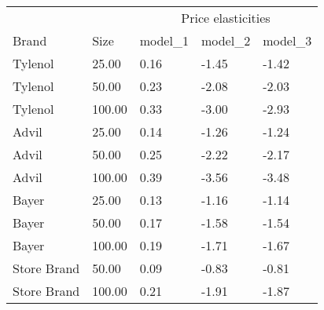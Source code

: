 \begin{table}
\centering
\begin{tabular}[t]{lllll}
\toprule
\multicolumn{2}{c}{ } & \multicolumn{3}{c}{Price elasticities} \\
\cmidrule(l{3pt}r{3pt}){3-5}
Brand & Size & model_1 & model_2 & model_3\\
\midrule
Tylenol & 25.00 & 0.16 & -1.45 & -1.42\\
Tylenol & 50.00 & 0.23 & -2.08 & -2.03\\
Tylenol & 100.00 & 0.33 & -3.00 & -2.93\\
Advil & 25.00 & 0.14 & -1.26 & -1.24\\
Advil & 50.00 & 0.25 & -2.22 & -2.17\\
Advil & 100.00 & 0.39 & -3.56 & -3.48\\
Bayer & 25.00 & 0.13 & -1.16 & -1.14\\
Bayer & 50.00 & 0.17 & -1.58 & -1.54\\
Bayer & 100.00 & 0.19 & -1.71 & -1.67\\
Store Brand & 50.00 & 0.09 & -0.83 & -0.81\\
Store Brand & 100.00 & 0.21 & -1.91 & -1.87\\
\bottomrule
\end{tabular}
\end{table}
